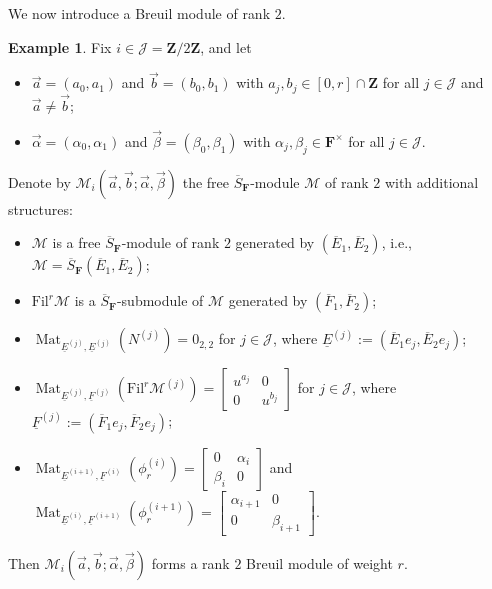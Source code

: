 \documentclass[11pt]{amsart}
\theoremstyle{definition}
\numberwithin{equation}{subsection}
\theoremstyle{plain}
\theoremstyle{plain}
\theoremstyle{plain}
\theoremstyle{plain}
\theoremstyle{plain}
\theoremstyle{plain}
\theoremstyle{plain}
\theoremstyle{plain}
\theoremstyle{plain}
\theoremstyle{plain}
\theoremstyle{plain}
\theoremstyle{plain}
\theoremstyle{definition}
\theoremstyle{definition}
\theoremstyle{definition}
\newtheorem{exam}[equation]{Example}
\theoremstyle{remark}
\renewcommand{\(}{\textup{(}}
\renewcommand{\)}{\textup{)}}
\DeclareMathOperator{\Mat}{Mat}
\newcommand{\Z}{\mathbf{Z}}
\newcommand{\F}{\mathbf{F}}
\newcommand{\barS}{\overline{S}}
\newcommand{\cM}{\mathcal{M}}
\newcommand{\Fil}{\mathrm{Fil}}
\newcommand{\cJ}{\mathcal{J}}
\newcommand{\barE}{\overline{E}}
\newcommand{\barF}{\overline{F}}
\newcommand{\baseE}{\underline{E}}
\newcommand{\baseF}{\underline{F}}
\begin{document}
We now introduce a Breuil module of rank $2$.
\begin{exam}\label{exam: rank 2 BrMod}
Fix $i\in\cJ=\Z/2\Z$, and let
    \begin{itemize}[leftmargin=*]
      \item $\vec{a}=(a_0,a_1)$ and $\vec{b}=(b_0,b_1)$ with $a_j,b_j\in[0,r]\cap\Z$ for all $j\in\cJ$ and $\vec{a}\neq\vec{b}$;
      \item $\vec{\alpha}=(\alpha_0,\alpha_1)$ and $\vec{\beta}=(\beta_0,\beta_1)$ with $\alpha_j,\beta_j\in\F^\times$ for all $j\in\cJ$.
    \end{itemize}
Denote by $\cM_i(\vec{a},\vec{b};\vec{\alpha},\vec{\beta})$ the free $\barS_\F$-module $\cM$ of rank $2$ with additional structures:
\begin{itemize}[leftmargin=*]
\item $\cM$ is a free $\barS_\F$-module of rank $2$ generated by $(\barE_1,\barE_2)$, i.e., $\cM=\barS_{\F}(\barE_1,\barE_2)$;
\item $\Fil^r\cM$ is a $\barS_\F$-submodule of $\cM$ generated by $(\barF_1,\barF_2)$;
\item $\Mat_{\baseE^{(j)},\baseE^{(j)}}(N^{(j)})=0_{2,2}$ for $j\in\cJ$, where $\baseE^{(j)}:=(\barE_1e_j,\barE_2e_j)$;
\item $\Mat_{\baseE^{(j)},\baseF^{(j)}}(\Fil^r\cM^{(j)})=
      \begin{bmatrix}
        u^{a_j} & 0 \\
        0 & u^{b_j}
      \end{bmatrix}$ for $j\in\cJ$, where $\baseF^{(j)}:=(\barF_1e_j,\barF_2e_j)$;
\item $\Mat_{\baseE^{(i+1)},\baseF^{(i)}}(\phi_r^{(i)})=
      \begin{bmatrix}
        0 & \alpha_i \\
        \beta_i & 0
      \end{bmatrix}$ and 
      $\Mat_{\baseE^{(i)},\baseF^{(i+1)}}(\phi_r^{(i+1)})=
      \begin{bmatrix}
        \alpha_{i+1} & 0 \\
        0 & \beta_{i+1}
      \end{bmatrix}$.
    \end{itemize}
Then $\cM_i(\vec{a},\vec{b};\vec{\alpha},\vec{\beta})$ forms a rank $2$ Breuil module of weight $r$.
\end{exam}
\end{document}
